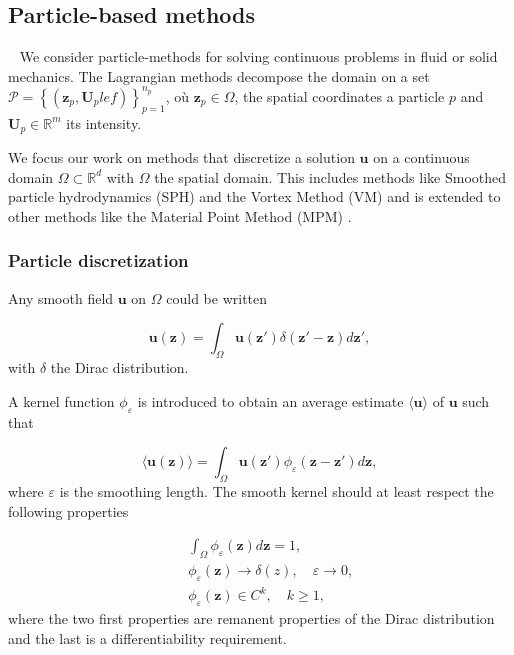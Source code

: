 
\subsection{Particle-based methods}~\label{Background_Part}
We consider particle-methods for solving continuous problems in fluid or solid mechanics. The Lagrangian methods decompose the domain on a set $\mathcal P = \left\{(\bm z_p, \bm U_plef)\right\}_{p = 1}^{n_p}$, où $\bm z_p \in \Omega$, the spatial coordinates a particle $p$ and $\bm U_p \in \mathbb{R}^m$ its intensity.


We focus our work on methods that discretize a solution $\bm u$ on a continuous domain $\Omega \subset \mathbb{R}^d$ with $\Omega$ the spatial domain. This includes methods like Smoothed particle hydrodynamics (SPH) \cite{gingold_monaghan_sph_1977,lucy_1977} and the Vortex Method (VM) \cite{cottet_vortex_2000} and is extended to other methods like the Material Point Method (MPM) \cite{sulsky_particle_1994}.

\subsubsection{Particle discretization}

Any smooth field $\bm u$ on $\Omega$ could be written

\begin{equation*}
	\bm u(\bm z) = \int_{\Omega} \bm u(\bm z') \delta(\bm z' - \bm z)  d\bm z',
\end{equation*}with $\delta$ the Dirac distribution.

A kernel function $\phi_\varepsilon$ is introduced to obtain an average estimate $\langle \bm u \rangle$ of $\bm u$ such that

\begin{equation*}
	\langle \bm u(\bm z) \rangle = \int_{\Omega} \bm u(\bm z') \phi_\varepsilon(\bm z-\bm z') d\bm z,
\end{equation*}where $\varepsilon$ is the smoothing length. The smooth kernel should at least respect the following properties

\begin{eqnarray*}
	&& \int_{\Omega} \phi_\varepsilon(\bm z) d\bm z = 1,      \\
	&& \phi_\varepsilon(\bm z) \to \delta(z), \quad \varepsilon \to 0, \\
	&& \phi_\varepsilon(\bm z) \in C^k,  \quad k \geq 1,
\end{eqnarray*} where the two first properties are remanent properties of the Dirac distribution and the last is a differentiability requirement.

